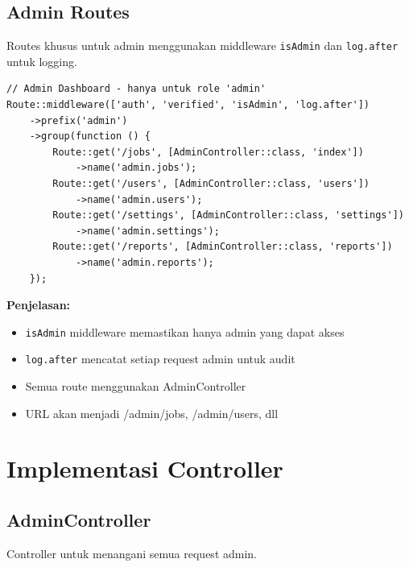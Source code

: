 \documentclass[a4paper,oneside,11pt]{book}
\begin{document}
\subsection{Admin Routes}
Routes khusus untuk admin menggunakan middleware \texttt{isAdmin} dan \texttt{log.after} untuk logging.

\begin{lstlisting}[style=phpstyle]
// Admin Dashboard - hanya untuk role 'admin'
Route::middleware(['auth', 'verified', 'isAdmin', 'log.after'])
    ->prefix('admin')
    ->group(function () {
        Route::get('/jobs', [AdminController::class, 'index'])
            ->name('admin.jobs');
        Route::get('/users', [AdminController::class, 'users'])
            ->name('admin.users');
        Route::get('/settings', [AdminController::class, 'settings'])
            ->name('admin.settings');
        Route::get('/reports', [AdminController::class, 'reports'])
            ->name('admin.reports');
    });
\end{lstlisting}

\textbf{Penjelasan:}
\begin{itemize}
    \item \texttt{isAdmin} middleware memastikan hanya admin yang dapat akses
    \item \texttt{log.after} mencatat setiap request admin untuk audit
    \item Semua route menggunakan AdminController
    \item URL akan menjadi /admin/jobs, /admin/users, dll
\end{itemize}

\section{Implementasi Controller}

\subsection{AdminController}
Controller untuk menangani semua request admin.
\end{document}
